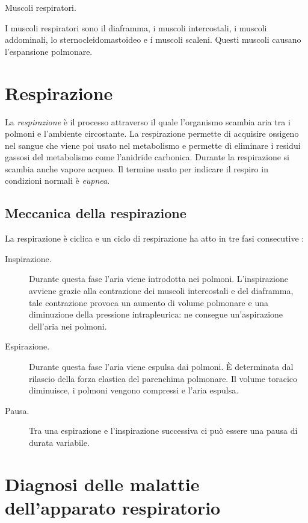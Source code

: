\begin{bf}Muscoli respiratori.\end{bf}
    I muscoli respiratori sono il diaframma, i muscoli intercostali, i muscoli addominali, lo sternocleidomastoideo e i muscoli scaleni. Questi muscoli causano l'espansione polmonare.




\section{Respirazione}

La \emph{respirazione} \`e il processo attraverso il quale l'organismo scambia aria tra i polmoni e l'ambiente circostante. 
La respirazione permette di acquisire ossigeno nel sangue che viene poi usato nel metabolismo e permette di eliminare i residui gassosi del metabolismo come l'anidride carbonica. Durante la respirazione si scambia anche vapore acqueo. 
Il termine usato per indicare il respiro in condizioni normali \`e \emph{eupnea}.  

\subsection{Meccanica della respirazione}

La respirazione \`e ciclica e un ciclo di respirazione ha atto in tre fasi consecutive \cite{meccanicaRespi, wikiMeccaRespi}:
\begin{description}
  \item[Inspirazione.]
    Durante questa fase l'aria viene introdotta nei polmoni. L'inspirazione avviene grazie alla contrazione dei muscoli intercostali e del diaframma, tale contrazione provoca un aumento di volume polmonare e una diminuzione della pressione intrapleurica: ne consegue un'aspirazione dell'aria nei polmoni.
  \item[Espirazione.]
    Durante questa fase l'aria viene espulsa dai polmoni. 
    \`E determinata dal rilascio della forza elastica del parenchima polmonare. Il volume toracico diminuisce, i polmoni vengono compressi e l'aria espulsa.
    \item[Pausa.]
    Tra una espirazione e l'inspirazione successiva ci pu\`o essere una pausa di durata variabile. 
\end{description}

\section{Diagnosi delle malattie dell'apparato respiratorio}



